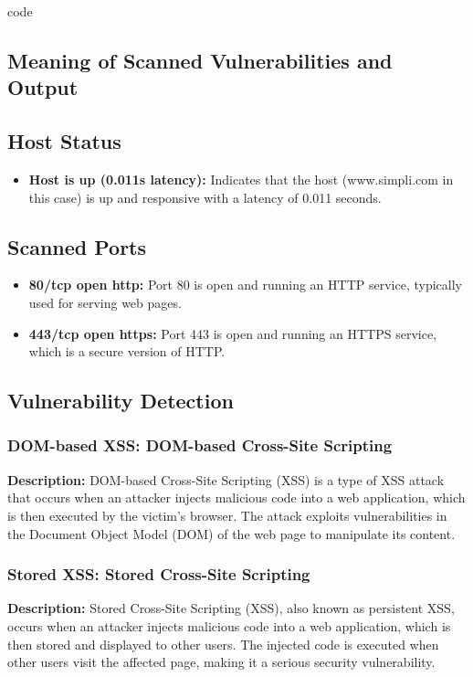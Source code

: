 code \documentclass[11pt]{article}
\begin{document}
\subsection*{Meaning of Scanned Vulnerabilities and Output}
\subsection*{Host Status}
\begin{itemize}
    \item \textbf{Host is up (0.011s latency):} Indicates that the host (www.simpli.com in this case) is up and responsive with a latency of 0.011 seconds.
\end{itemize}

\subsection*{Scanned Ports}
\begin{itemize}
    \item \textbf{80/tcp  open  http:} Port 80 is open and running an HTTP service, typically used for serving web pages.
    \item \textbf{443/tcp open  https:} Port 443 is open and running an HTTPS service, which is a secure version of HTTP.
\end{itemize}

\subsection*{Vulnerability Detection}

\subsubsection*{DOM-based XSS: DOM-based Cross-Site Scripting}

\textbf{Description:} DOM-based Cross-Site Scripting (XSS) is a type of XSS attack that occurs when an attacker injects malicious code into a web application, which is then executed by the victim's browser. The attack exploits vulnerabilities in the Document Object Model (DOM) of the web page to manipulate its content.

\subsubsection*{Stored XSS: Stored Cross-Site Scripting}

\textbf{Description:} Stored Cross-Site Scripting (XSS), also known as persistent XSS, occurs when an attacker injects malicious code into a web application, which is then stored and displayed to other users. The injected code is executed when other users visit the affected page, making it a serious security vulnerability.
\end{document}
